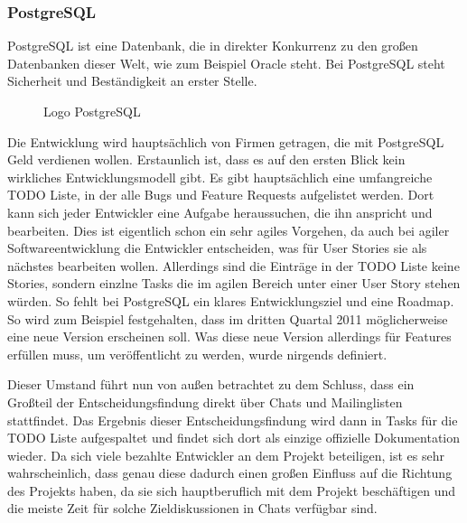 \subsubsection{PostgreSQL}
PostgreSQL ist eine Datenbank, die in direkter Konkurrenz zu den großen Datenbanken dieser Welt, wie zum Beispiel Oracle steht\cite{bib:pg-oracle}. Bei PostgreSQL steht Sicherheit und Beständigkeit an erster Stelle.
\begin{figure}[h]
	\centering
	\caption{Logo PostgreSQL\cite{bib:pg-logo}}
	\label{pgLogo}
\end{figure}
Die Entwicklung wird hauptsächlich von Firmen getragen, die mit Post\-gre\-SQL Geld verdienen wollen\cite{bib:pg-contrib}. Erstaunlich ist, dass es auf den ersten Blick kein wirkliches Entwicklungsmodell gibt. Es gibt hauptsächlich eine umfangreiche TODO Liste, in der alle Bugs und Feature Requests aufgelistet werden\cite{bib:pg-todo}. Dort kann sich jeder Entwickler eine Aufgabe heraussuchen, die ihn anspricht und bearbeiten. Dies ist eigentlich schon ein sehr agiles Vorgehen, da auch bei agiler Softwareentwicklung die Entwickler entscheiden, was für User Stories sie als nächstes bearbeiten wollen. Allerdings sind die Einträge in der TODO Liste keine Stories, sondern einzlne Tasks die im agilen Bereich unter einer User Story stehen würden. So fehlt bei PostgreSQL ein klares Entwicklungsziel und eine Roadmap. So wird zum Beispiel festgehalten, dass im dritten Quartal 2011 möglicherweise eine neue Version erscheinen soll. Was diese neue Version allerdings für Features erfüllen muss, um veröffentlicht zu werden, wurde nirgends definiert\cite{bib:pg-roadmap}.

Dieser Umstand führt nun von außen betrachtet zu dem Schluss, dass ein Großteil der Entscheidungsfindung direkt über Chats und Mailinglisten stattfindet. Das Ergebnis dieser Entscheidungsfindung wird dann in Tasks für die TODO Liste aufgespaltet und findet sich dort als einzige offizielle Dokumentation wieder. Da sich viele bezahlte Entwickler an dem Projekt beteiligen, ist es sehr wahrscheinlich, dass genau diese dadurch einen großen Einfluss auf die Richtung des Projekts haben, da sie sich hauptberuflich mit dem Projekt beschäftigen und die meiste Zeit für solche Zieldiskussionen in Chats verfügbar sind.

